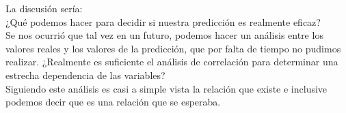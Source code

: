\documentclass{article}
\begin{document}
La discusión sería: \\ ¿Qué podemos hacer para decidir si nuestra predicción es realmente eficaz? \\
Se nos ocurrió que tal vez en un futuro, podemos hacer un análisis entre los valores reales y los valores de la predicción, que por falta de tiempo no pudimos realizar.
¿Realmente es suficiente el análisis de correlación para determinar una estrecha dependencia de las variables? \\
Siguiendo este análisis es casi a simple vista la relación que existe e inclusive podemos decir que es una relación que se esperaba.



\newpage

\end{document}
